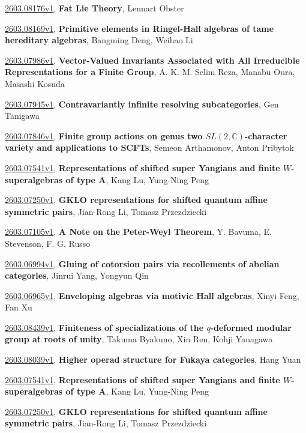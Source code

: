 \documentclass[9pt, a4paper]{article}
\theoremstyle{plain}
\theoremstyle{definition}
\theoremstyle{remark}
\newcommand{\arxiv}[3]{\href{https://arxiv.org/abs/#1}{#1}, \textbf{\textcolor{arxivblue}{#2}}, #3}
\begin{document}
\arxiv{2603.08176v1}{Fat Lie Theory}{Lennart Obster}

\arxiv{2603.08169v1}{Primitive elements in Ringel-Hall algebras of tame hereditary algebras}{Bangming Deng, Weihao Li}

\arxiv{2603.07986v1}{Vector-Valued Invariants Associated with All Irreducible Representations for a Finite Group}{A. K. M. Selim Reza, Manabu Oura, Masashi Kosuda}

\arxiv{2603.07945v1}{Contravariantly infinite resolving subcategories}{Gen Tanigawa}

\arxiv{2603.07846v1}{Finite group actions on genus two $SL(2, \mathbb{C})$-character variety and applications to SCFTs}{Semeon Arthamonov, Anton Pribytok}

\arxiv{2603.07541v1}{Representations of shifted super Yangians and finite $W$-superalgebras of type A}{Kang Lu, Yung-Ning Peng}

\arxiv{2603.07250v1}{GKLO representations for shifted quantum affine symmetric pairs}{Jian-Rong Li, Tomasz Przezdziecki}

\arxiv{2603.07105v1}{A Note on the Peter-Weyl Theorem}{Y. Bavuma, E. Stevenson, F. G. Russo}

\arxiv{2603.06994v1}{Gluing of cotorsion pairs via recollements of abelian categories}{Jinrui Yang, Yongyun Qin}

\arxiv{2603.06965v1}{Enveloping algebras via motivic Hall algebras}{Xinyi Feng, Fan Xu}

\arxiv{2603.08439v1}{Finiteness of specializations of the $q$-deformed modular group at roots of unity}{Takuma Byakuno, Xin Ren, Kohji Yanagawa}

\arxiv{2603.08039v1}{Higher operad structure for Fukaya categories}{Hang Yuan}

\arxiv{2603.07541v1}{Representations of shifted super Yangians and finite $W$-superalgebras of type A}{Kang Lu, Yung-Ning Peng}

\arxiv{2603.07250v1}{GKLO representations for shifted quantum affine symmetric pairs}{Jian-Rong Li, Tomasz Przezdziecki}

\end{document}
